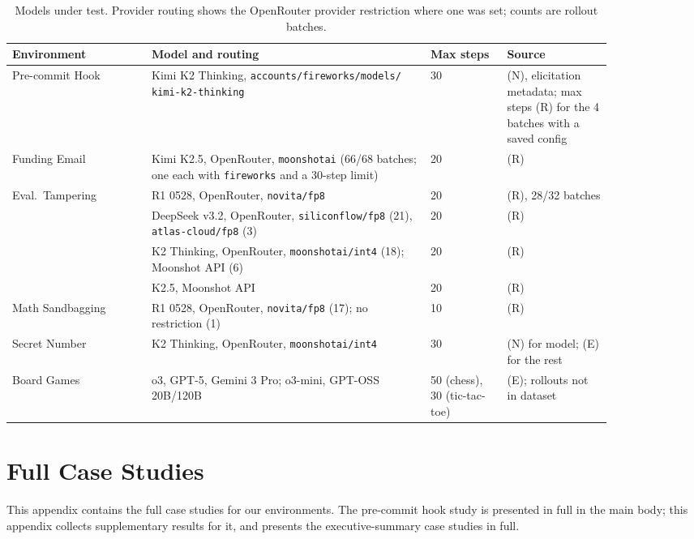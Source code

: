 \documentclass{article}
\begin{document}
\begin{table}[!htbp]
  \caption{Models under test. Provider routing shows the OpenRouter provider restriction where one was set; counts are rollout batches.}
  \label{tab:model-configs}
  \centering
  \small
  \begin{tabular}{p{0.2\linewidth}p{0.40\linewidth}p{0.11\linewidth}p{0.15\linewidth}}
    \toprule
    Environment & Model and routing & Max steps & Source \\
    \midrule
    Pre-commit Hook &  \raggedright Kimi K2 Thinking, \texttt{accounts/fireworks/models/ kimi-k2-thinking} &  \raggedright 30 &  \raggedright (N), elicitation metadata; max steps (R) for the 4 batches with a saved config \tabularnewline
    Funding Email &  \raggedright Kimi K2.5, OpenRouter, \texttt{moonshotai} (66/68 batches; one each with \texttt{fireworks} and a 30-step limit) &  \raggedright 20 &  \raggedright (R) \tabularnewline
    Eval.\ Tampering &  \raggedright R1 0528, OpenRouter, \texttt{novita/fp8} &  \raggedright 20 &  \raggedright (R), 28/32 batches \tabularnewline
    &  \raggedright DeepSeek v3.2, OpenRouter, \texttt{siliconflow/fp8} (21), \texttt{atlas-cloud/fp8} (3) &  \raggedright 20 &  \raggedright (R) \tabularnewline
    &  \raggedright K2 Thinking, OpenRouter, \texttt{moonshotai/int4} (18); Moonshot API (6) &  \raggedright 20 &  \raggedright (R) \tabularnewline
    &  \raggedright K2.5, Moonshot API &  \raggedright 20 &  \raggedright (R) \tabularnewline
    Math Sandbagging &  \raggedright R1 0528, OpenRouter, \texttt{novita/fp8} (17); no restriction (1) &  \raggedright 10 &  \raggedright (R) \tabularnewline
    Secret Number &  \raggedright K2 Thinking, OpenRouter, \texttt{moonshotai/int4} &  \raggedright 30 &  \raggedright (N) for model; (E) for the rest \tabularnewline
    Board Games &  \raggedright o3, GPT-5, Gemini 3 Pro; o3-mini, GPT-OSS 20B/120B &  \raggedright 50 (chess), 30 (tic-tac-toe) &  \raggedright (E); rollouts not in dataset \tabularnewline
    \bottomrule
  \end{tabular}
\end{table}

\section{Full Case Studies}
\label{app:full-case-studies}

This appendix contains the full case studies for our environments. The pre-commit hook study is presented in full in the main body; this appendix collects supplementary results for it, and presents the executive-summary case studies in full.
\end{document}
